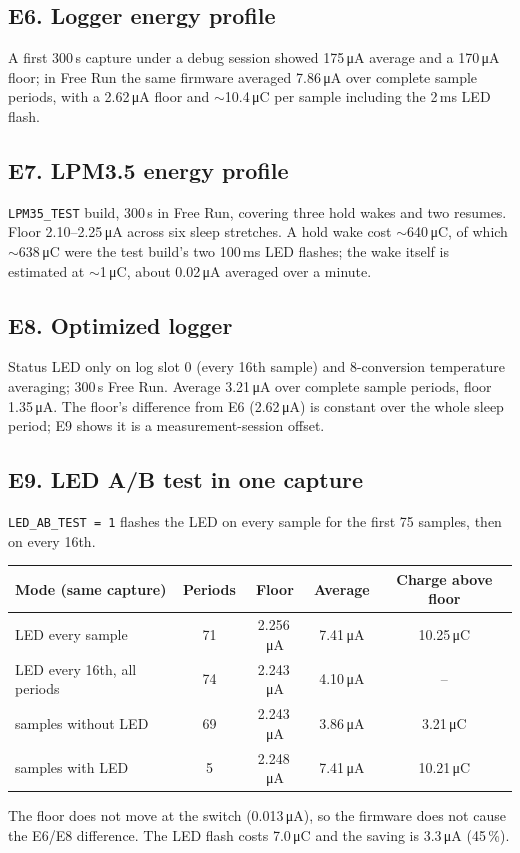\documentclass[conference]{IEEEtran}
\newcommand{\uA}{\,\si{\micro\ampere}}
\newcommand{\uC}{\,\si{\micro\coulomb}}
\newcommand{\code}[1]{\texttt{#1}}
\begin{document}
\subsection*{E6. Logger energy profile}
A first 300\,s capture under a debug session showed 175\uA{} average and a 170\uA{} floor; in Free Run the same firmware averaged 7.86\uA{} over complete sample periods, with a 2.62\uA{} floor and $\sim$10.4\uC{} per sample including the 2\,ms LED flash.

\subsection*{E7. LPM3.5 energy profile}
\code{LPM35\_TEST} build, 300\,s in Free Run, covering three hold wakes and two resumes. Floor 2.10--2.25\uA{} across six sleep stretches. A hold wake cost $\sim$640\uC{}, of which $\sim$638\uC{} were the test build's two 100\,ms LED flashes; the wake itself is estimated at $\sim$1\uC, about 0.02\uA{} averaged over a minute.

\subsection*{E8. Optimized logger}
Status LED only on log slot 0 (every 16th sample) and 8-conversion temperature averaging; 300\,s Free Run. Average 3.21\uA{} over complete sample periods, floor 1.35\uA. The floor's difference from E6 (2.62\uA) is constant over the whole sleep period; E9 shows it is a measurement-session offset.

\subsection*{E9. LED A/B test in one capture}
\code{LED\_AB\_TEST = 1} flashes the LED on every sample for the first 75 samples, then on every 16th.

\begin{table}[H]
\centering\small
\begin{tabular}{@{}lcccc@{}}
\toprule
Mode (same capture) & Periods & Floor & Average & Charge above floor \\
\midrule
LED every sample & 71 & 2.256\uA & 7.41\uA & 10.25\uC{} \\
LED every 16th, all periods & 74 & 2.243\uA & 4.10\uA & -- \\
\quad samples without LED & 69 & 2.243\uA & 3.86\uA & 3.21\uC{} \\
\quad samples with LED & 5 & 2.248\uA & 7.41\uA & 10.21\uC{} \\
\bottomrule
\end{tabular}
\end{table}
\noindent The floor does not move at the switch (0.013\uA), so the firmware does not cause the E6/E8 difference. The LED flash costs 7.0\uC{} and the saving is 3.3\uA{} (45\,\%).
\end{document}
